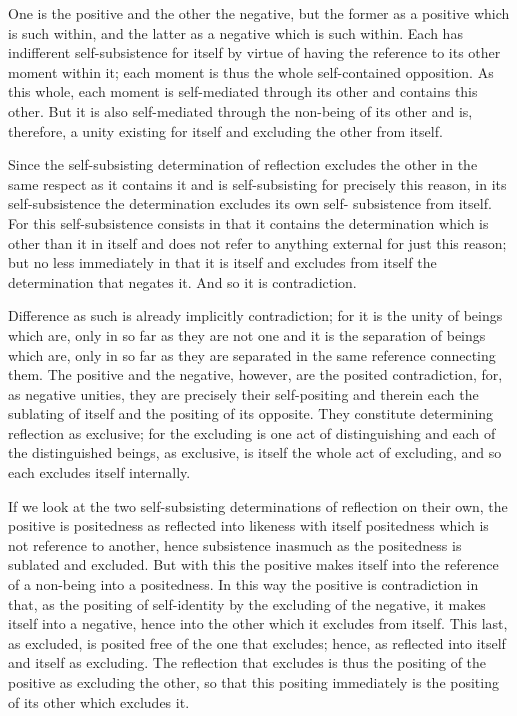 One is the positive and the other the negative, but the former as a positive
which is such within, and the latter as a negative which is such within. Each
has indifferent self-subsistence for itself by virtue of having the reference to
its other moment within it; each moment is thus the whole self-contained
opposition.  As this whole, each moment is self-mediated through its other
and contains this other. But it is also self-mediated through the non-being of
its other and is, therefore, a unity existing for itself and excluding the other
from itself.

Since the self-subsisting determination of reflection excludes the other
in the same respect as it contains it and is self-subsisting for precisely
this reason, in its self-subsistence the determination excludes its own self-
subsistence from itself. For this self-subsistence consists in that it contains
the determination which is other than it in itself and does not refer to
anything external for just this reason; but no less immediately in that it is
itself and excludes from itself the determination that negates it. And so it
is contradiction.

Difference as such is already implicitly contradiction; for it is the unity
of beings which are, only in so far as they are not one  and it is the
separation of beings which are, only in so far as they are separated in the
same reference connecting them. The positive and the negative, however, are
the posited contradiction, for, as negative unities, they are precisely their
self-positing and therein each the sublating of itself and the positing of
its opposite.  They constitute determining reflection as exclusive; for the
excluding is one act of distinguishing and each of the distinguished beings,
as exclusive, is itself the whole act of excluding, and so each excludes itself
internally.

If we look at the two self-subsisting determinations of reflection on
their own, the positive is positedness as reflected into likeness with itself
positedness which is not reference to another, hence subsistence inasmuch
as the positedness is sublated and excluded. But with this the positive makes
itself into the reference of a non-being  into a positedness.  In this way the
positive is contradiction  in that, as the positing of self-identity by the
excluding of the negative, it makes itself into a negative, hence into the other
which it excludes from itself. This last, as excluded, is posited free of the
one that excludes; hence, as reflected into itself and itself as excluding. The
reflection that excludes is thus the positing of the positive as excluding
the other, so that this positing immediately is the positing of its other
which excludes it.

